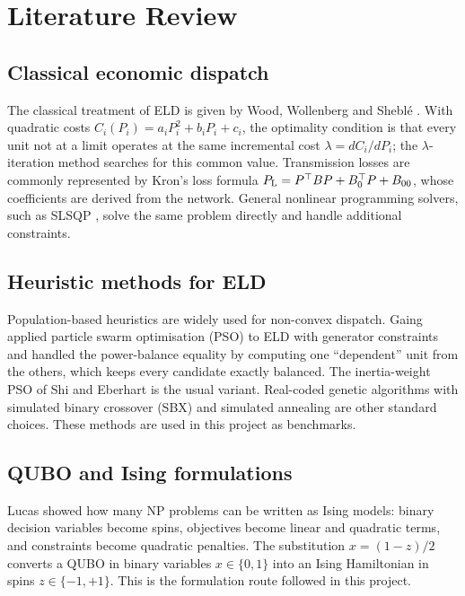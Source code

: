 \chapter{Literature Review}

\section{Classical economic dispatch}
The classical treatment of ELD is given by Wood, Wollenberg and Sheblé \cite{wood2014}. With quadratic costs $C_i(P_i) = a_iP_i^2 + b_iP_i + c_i$, the optimality condition is that every unit not at a limit operates at the same incremental cost $\lambda = dC_i/dP_i$; the $\lambda$-iteration method searches for this common value. Transmission losses are commonly represented by Kron's loss formula $P_{\mathrm{L}} = P^\top B P + B_0^\top P + B_{00}$, whose coefficients are derived from the network. General nonlinear programming solvers, such as SLSQP \cite{kraft1988}, solve the same problem directly and handle additional constraints.

\section{Heuristic methods for ELD}
Population-based heuristics are widely used for non-convex dispatch. Gaing \cite{gaing2003} applied particle swarm optimisation (PSO) to ELD with generator constraints and handled the power-balance equality by computing one ``dependent'' unit from the others, which keeps every candidate exactly balanced. The inertia-weight PSO of Shi and Eberhart \cite{shi1998} is the usual variant. Real-coded genetic algorithms with simulated binary crossover (SBX) \cite{deb1995} and simulated annealing \cite{kirkpatrick1983} are other standard choices. These methods are used in this project as benchmarks.

\section{QUBO and Ising formulations}
Lucas \cite{lucas2014} showed how many NP problems can be written as Ising models: binary decision variables become spins, objectives become linear and quadratic terms, and constraints become quadratic penalties. The substitution $x = (1 - z)/2$ converts a QUBO in binary variables $x \in \{0,1\}$ into an Ising Hamiltonian in spins $z \in \{-1,+1\}$. This is the formulation route followed in this project.

